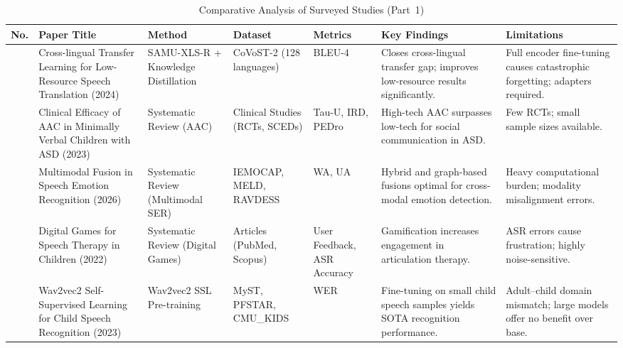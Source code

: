 \documentclass[conference]{IEEEtran}
\newcommand{\comparisonTableSetup}{%
  \small
  \setlength{\tabcolsep}{3pt}%
  \renewcommand{\arraystretch}{1.25}%
}
\begin{document}
\clearpage
\onecolumn

\begin{table}[p]
\centering
\caption{Comparative Analysis of Surveyed Studies (Part~1)}
\label{tab:comparative_analysis_part1}
\label{tab:comparison}
\comparisonTableSetup
\begin{tabularx}{\textwidth}{|>{\hsize=0.20\hsize\raggedright\arraybackslash}X|
                              >{\hsize=1.20\hsize\raggedright\arraybackslash}X|
                              >{\hsize=1.10\hsize\raggedright\arraybackslash}X|
                              >{\hsize=0.90\hsize\raggedright\arraybackslash}X|
                              >{\hsize=0.70\hsize\raggedright\arraybackslash}X|
                              >{\hsize=1.40\hsize\raggedright\arraybackslash}X|
                              >{\hsize=1.50\hsize\raggedright\arraybackslash}X|}
\hline
\textbf{No.} & \textbf{Paper Title} & \textbf{Method} & \textbf{Dataset} & \textbf{Metrics} & \textbf{Key Findings} & \textbf{Limitations} \\
\hline
1 & Cross-lingual Transfer Learning for Low-Resource Speech Translation (2024) & SAMU-XLS-R + Knowledge Distillation & CoVoST-2 (128 languages) & BLEU-4 & Closes cross-lingual transfer gap; improves low-resource results significantly. & Full encoder fine-tuning causes catastrophic forgetting; adapters required. \\
\hline
2 & Clinical Efficacy of AAC in Minimally Verbal Children with ASD (2023) & Systematic Review (AAC) & 8 Clinical Studies (RCTs, SCEDs) & Tau-U, IRD, PEDro & High-tech AAC surpasses low-tech for social communication in ASD. & Few RCTs; small sample sizes available. \\
\hline
3 & Multimodal Fusion in Speech Emotion Recognition (2026) & Systematic Review (Multimodal SER) & IEMOCAP, MELD, RAVDESS & WA, UA & Hybrid and graph-based fusions optimal for cross-modal emotion detection. & Heavy computational burden; modality misalignment errors. \\
\hline
4 & Digital Games for Speech Therapy in Children (2022) & Systematic Review (Digital Games) & 27 Articles (PubMed, Scopus) & User Feedback, ASR Accuracy & Gamification increases engagement in articulation therapy. & ASR errors cause frustration; highly noise-sensitive. \\
\hline
5 & Wav2vec2 Self-Supervised Learning for Child Speech Recognition (2023) & Wav2vec2 SSL Pre-training & MyST, PFSTAR, CMU\_KIDS & WER & Fine-tuning on small child speech samples yields SOTA recognition performance. & Adult--child domain mismatch; large models offer no benefit over base. \\

\end{tabularx}
\end{table}
\end{document}
